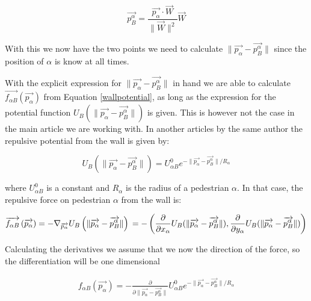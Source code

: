 \begin{equation}\label{wall}
\overrightarrow{p_{B}^{\alpha}}=\frac{\overrightarrow{p_{\alpha}}\cdot \overrightarrow{W}}{\| \overrightarrow{W} \|^2}\overrightarrow{W}
\end{equation}

With this we now have the two points we need to calculate $\|\overrightarrow{p_{\alpha}} - \overrightarrow{p_{B}^{\alpha}}\|$ 
since the position of $\alpha$ is know at all times.

With the explicit expression for $ \| \overrightarrow{p_{\alpha}} - \overrightarrow{p_{B}^{\alpha}} \| $ 
in hand we are able to calculate $\overrightarrow{f_{\alpha B}} \left( \overrightarrow{p_{\alpha}} \right)$ from 
Equation \ref{wallpotential}, as long as the expression for the potential function 
$U_{B}\left( \| \overrightarrow{p_{\alpha}} - \overrightarrow{p_{B}^{\alpha}} \| \right)$ is given. This is 
however not the case in the main article we are working with. In another articles \cite{ABconstant} by 
the same author the repulsive potential from the wall is given by: 

\begin{equation}
U_{B} \left( \| \overrightarrow{p_{\alpha}} - \overrightarrow{p_{B}^{\alpha}} \| \right) =
U^0_{\alpha B} e^{- \| \overrightarrow{p_{\alpha}} - \overrightarrow{p_{B}^{\alpha}} \| / R_{\alpha} }
\end{equation}

where $U^0_{\alpha B}$ is a constant and $R_{\alpha}$ is the radius of a pedestrian $\alpha$.
In that case, the repulsive force on pedestrian $ \alpha $ from the wall is:

\begin{equation}
    \overrightarrow{f_{\alpha B}} \left( \overrightarrow{p_{\alpha}} \right) =
    - \nabla_{\overrightarrow{p_{\alpha}}} U_{B}
    \left( \| \overrightarrow{p_{\alpha}} - \overrightarrow{p_{B}^{\alpha}} \| \right)\\
=-\left( \frac{\partial}{\partial x_{\alpha}}U_{B}( \| \overrightarrow{p_{\alpha}} - \overrightarrow{p_{B}^{\alpha}} \|), \frac{\partial}{\partial y_{\alpha}}U_{B}( \| \overrightarrow{p_{\alpha}} - \overrightarrow{p_{B}^{\alpha}} \|)\right)
\end{equation}

Calculating the derivatives we assume that we now the direction of the force, so the differentiation will be one dimensional

\begin{equation}
\begin{split}
f_{\alpha B} \left( \overrightarrow{p_{\alpha}} \right) 
 = -\frac{\partial}{\partial \| \overrightarrow{p_{\alpha}} - \overrightarrow{p_{B}^{\alpha}} \|}U^0_{\alpha B} e^{- \| \overrightarrow{p_{\alpha}} - \overrightarrow{p_{B}^{\alpha}} \| / R_{\alpha} }
\end{split}
\end{equation}

